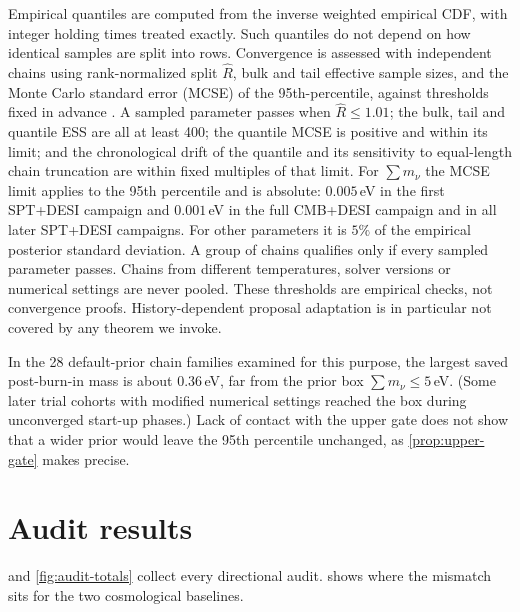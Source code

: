 \documentclass[11pt]{article}
\theoremstyle{remark}
\newcommand{\mnu}{\sum m_\nu}
\numberwithin{equation}{section}
\begin{document}
Empirical quantiles are computed from the inverse weighted empirical CDF, with integer holding times treated exactly. Such quantiles do not depend on how identical samples are split into rows. Convergence is assessed with independent chains using rank-normalized split $\hat R$, bulk and tail effective sample sizes, and the Monte Carlo standard error (MCSE) of the 95th-percentile, against thresholds fixed in advance \cite{gelman_rubin1992,vehtari2021_rhat}. A sampled parameter passes when $\hat R\le1.01$; the bulk, tail and quantile ESS are all at least 400; the quantile MCSE is positive and within its limit; and the chronological drift of the quantile and its sensitivity to equal-length chain truncation are within fixed multiples of that limit. For $\mnu$ the MCSE limit applies to the 95th percentile and is absolute: $0.005$\,eV in the first SPT+DESI campaign and $0.001$\,eV in the full CMB+DESI campaign and in all later SPT+DESI campaigns. For other parameters it is $5\%$ of the empirical posterior standard deviation. A group of chains qualifies only if every sampled parameter passes. Chains from different temperatures, solver versions or numerical settings are never pooled. These thresholds are empirical checks, not convergence proofs. History-dependent proposal adaptation is in particular not covered by any theorem we invoke.

In the 28 default-prior chain families examined for this purpose, the largest saved post-burn-in mass is about $0.36$\,eV, far from the prior box $\mnu\le5$\,eV. (Some later trial cohorts with modified numerical settings reached the box during unconverged start-up phases.) Lack of contact with the upper gate does not show that a wider prior would leave the 95th percentile unchanged, as \cref{prop:upper-gate} makes precise.
 \section{Audit results}
\label{sec:results-audits}

 and \cref{fig:audit-totals} collect every directional audit.  shows where the mismatch sits for the two cosmological baselines.
\end{document}
